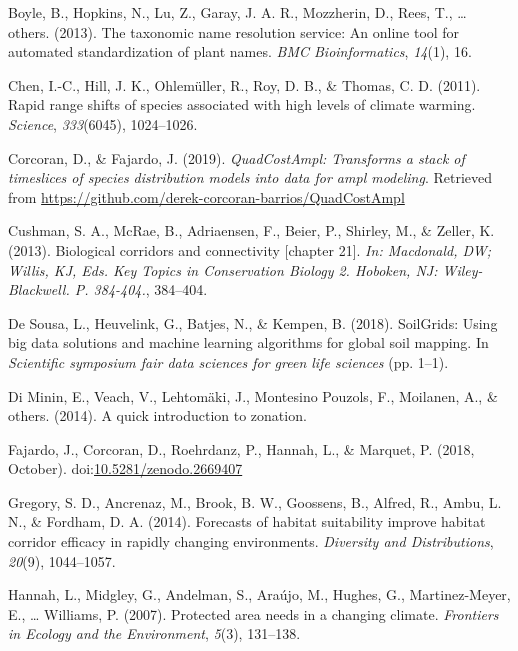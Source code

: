 \documentclass[]{article}
\begin{document}
\leavevmode\hypertarget{ref-boyle2013taxonomic}{}%
Boyle, B., Hopkins, N., Lu, Z., Garay, J. A. R., Mozzherin, D., Rees, T., \ldots{} others. (2013). The taxonomic name resolution service: An online tool for automated standardization of plant names. \emph{BMC Bioinformatics}, \emph{14}(1), 16.

\leavevmode\hypertarget{ref-chen2011rapid}{}%
Chen, I.-C., Hill, J. K., Ohlemüller, R., Roy, D. B., \& Thomas, C. D. (2011). Rapid range shifts of species associated with high levels of climate warming. \emph{Science}, \emph{333}(6045), 1024--1026.

\leavevmode\hypertarget{ref-Corcoran_Quadcost}{}%
Corcoran, D., \& Fajardo, J. (2019). \emph{QuadCostAmpl: Transforms a stack of timeslices of species distribution models into data for ampl modeling}. Retrieved from \url{https://github.com/derek-corcoran-barrios/QuadCostAmpl}

\leavevmode\hypertarget{ref-cushman2013biological}{}%
Cushman, S. A., McRae, B., Adriaensen, F., Beier, P., Shirley, M., \& Zeller, K. (2013). Biological corridors and connectivity {[}chapter 21{]}. \emph{In: Macdonald, DW; Willis, KJ, Eds. Key Topics in Conservation Biology 2. Hoboken, NJ: Wiley-Blackwell. P. 384-404.}, 384--404.

\leavevmode\hypertarget{ref-de2018soilgrids}{}%
De Sousa, L., Heuvelink, G., Batjes, N., \& Kempen, B. (2018). SoilGrids: Using big data solutions and machine learning algorithms for global soil mapping. In \emph{Scientific symposium fair data sciences for green life sciences} (pp. 1--1).

\leavevmode\hypertarget{ref-di2014quick}{}%
Di Minin, E., Veach, V., Lehtomäki, J., Montesino Pouzols, F., Moilanen, A., \& others. (2014). A quick introduction to zonation.

\leavevmode\hypertarget{ref-fajardo_javier_2018_2669407}{}%
Fajardo, J., Corcoran, D., Roehrdanz, P., Hannah, L., \& Marquet, P. (2018, October). doi:\href{https://doi.org/10.5281/zenodo.2669407}{10.5281/zenodo.2669407}

\leavevmode\hypertarget{ref-gregory2014forecasts}{}%
Gregory, S. D., Ancrenaz, M., Brook, B. W., Goossens, B., Alfred, R., Ambu, L. N., \& Fordham, D. A. (2014). Forecasts of habitat suitability improve habitat corridor efficacy in rapidly changing environments. \emph{Diversity and Distributions}, \emph{20}(9), 1044--1057.

\leavevmode\hypertarget{ref-hannah2007protected}{}%
Hannah, L., Midgley, G., Andelman, S., Araújo, M., Hughes, G., Martinez-Meyer, E., \ldots{} Williams, P. (2007). Protected area needs in a changing climate. \emph{Frontiers in Ecology and the Environment}, \emph{5}(3), 131--138.
\end{document}
